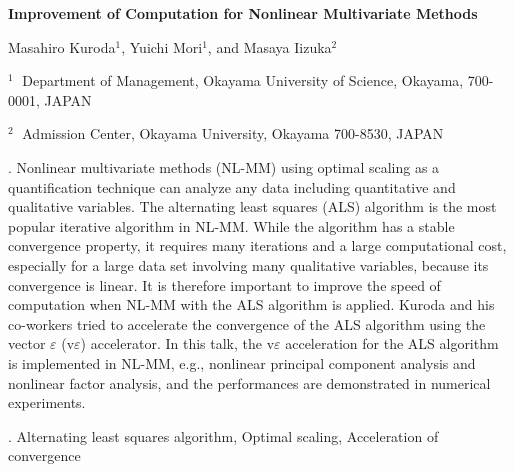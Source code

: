 \documentclass[12pt]{article}
\begin{document}
\begin{flushleft}


{\LARGE\bf 
Improvement of Computation for Nonlinear Multivariate Methods}


\vspace{1.0cm}

Masahiro Kuroda$^1$, Yuichi Mori$^1$, and Masaya Iizuka$^2$

\begin{description}
%
\item $^1 \;$ Department of Management, Okayama University of Science,
Okayama, 700-0001, JAPAN
\item $^2 \;$ Admission Center, Okayama University,
Okayama 700-8530, JAPAN
%
\end{description}

\end{flushleft}


\vspace{0.75cm}

. 
Nonlinear multivariate methods (NL-MM) using optimal scaling as a quantification 
technique can analyze any data including quantitative and qualitative variables. 
The alternating least squares (ALS) algorithm is the most popular iterative 
algorithm in NL-MM. While the algorithm has a stable convergence property, it 
requires many iterations and a large computational cost, especially for a large 
data set involving many qualitative variables, because its convergence is linear. 
It is therefore important to improve the speed of computation when NL-MM with the 
ALS algorithm is applied. Kuroda and his co-workers tried to accelerate the 
convergence of the ALS algorithm using the vector $\varepsilon$ (v$\varepsilon$) 
accelerator. In this talk, the v$\varepsilon$ acceleration for the ALS algorithm 
is implemented in NL-MM, e.g., nonlinear principal component analysis and nonlinear 
factor analysis, and the performances are demonstrated in numerical experiments. 



\vskip 2mm

.
Alternating least squares algorithm, Optimal scaling, Acceleration of convergence
\end{document}
